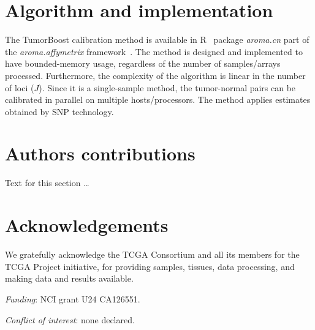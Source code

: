 \documentclass[10pt]{bmc_article}
\newenvironment{bmcformat}{\fussy\setboolean{publ}{true}}{\fussy}
\newcommand{\pkg}[1]{\textit{#1}\xspace}
\begin{document}
\begin{bmcformat}
\section*{Algorithm and implementation}
The TumorBoost calibration method is available in R~\cite{RDevel_2008} package \pkg{aroma.cn} part of the \pkg{aroma.affymetrix} framework~\cite{BengtssonH_etal_2008b}.  The  method is designed and implemented to have bounded-memory usage, regardless of the number of samples/arrays processed. 
Furthermore, the complexity of the algorithm is linear in the number of loci ($J$).
Since it is a single-sample method, the tumor-normal pairs can be calibrated in parallel on multiple hosts/processors.
The method applies estimates obtained by SNP technology.




    
\section*{Authors contributions}
    Text for this section \ldots

    

\section*{Acknowledgements}

We gratefully acknowledge the TCGA Consortium and all its members for the TCGA Project initiative, for providing samples, tissues, data processing, and making data and results available.

\emph{Funding}: NCI grant U24 CA126551.

\emph{Conflict of interest}: none declared.

 



\end{bmcformat}
\end{document}
